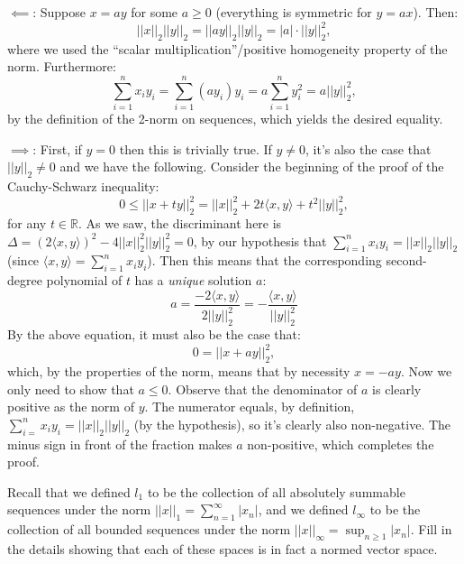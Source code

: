 \begin{solution}

    $\impliedby$: Suppose $x = ay$ for some $a \geq 0$ (everything is symmetric for $y = ax$).
    Then:
    $$\lvert \lvert x \rvert \rvert_2 \lvert \lvert y \rvert \rvert_2 = \lvert \lvert a y \rvert \rvert_2 \lvert \lvert y \rvert \rvert_2 = \lvert a \rvert \cdot \lvert \lvert y \rvert \rvert_2^2,$$
    where we used the ``scalar multiplication''/positive homogeneity property of the norm.
    Furthermore:
    $$\sum_{i = 1}^{n} x_i y_i = \sum_{i=1}^{n} (a y_i) y_i = a \sum_{i=1}^{n} y_i^2 = a \lvert \lvert y \rvert \rvert_2^2,$$ 
    by the definition of the 2-norm on sequences, which yields the desired equality.

    $\implies$: First, if $y = 0$ then this is trivially true. If $y \neq 0$, it's also the case that $\lvert \lvert y \rvert \rvert_2 \neq 0$ and we have the following.
    Consider the beginning of the proof of the Cauchy-Schwarz inequality:
    $$0 \leq \lvert \lvert x + ty \rvert \rvert_2^2 = \lvert \lvert x \rvert \rvert_2^2 + 2t \langle x, y \rangle + t^2 \lvert \lvert y \rvert \rvert_2^2,$$
    for any $t \in \mathbb{R}$. 
    As we saw, the discriminant here is $\Delta = (2\langle x, y \rangle)^2 - 4 \lvert \lvert x \rvert \rvert_2^2 \lvert \lvert y \rvert \rvert_2^2 = 0$, by our hypothesis that $\sum_{i=1}^{n} x_i y_i = \lvert \lvert x \rvert \rvert_2 \lvert \lvert y \rvert \rvert_2$ (since $\langle x, y \rangle = \sum_{i=1}^{n} x_i y_i$).
    Then this means that the corresponding second-degree polynomial of $t$ has a \textit{unique} solution $a$:
    $$a = \frac{-2 \langle x, y \rangle}{2\lvert \lvert y \rvert \rvert_2^2} = -\frac{ \langle x, y \rangle}{\lvert \lvert y \rvert \rvert_2^2}$$
    By the above equation, it must also be the case that:
    $$0 = \lvert \lvert x + ay \rvert \rvert_2^2,$$
    which, by the properties of the norm, means that by necessity $x = -ay$.
    Now we only need to show that $a \leq 0$.
    Observe that the denominator of $a$ is clearly positive as the norm of $y$.
    The numerator equals, by definition, $\sum_{i=}^{n} x_i y_i = \lvert \lvert x \rvert \rvert_2 \lvert \lvert y \rvert \rvert_2$ (by the hypothesis), so it's clearly also non-negative.
    The minus sign in front of the fraction makes $a$ non-positive, which completes the proof.

\end{solution}

\begin{exercise}{21}
    Recall that we defined $l_1$ to be the collection of all absolutely summable sequences under the norm $\lvert \lvert x \rvert \rvert_1 = \sum_{n=1}^{\infty} \lvert x_n \rvert$, and we defined $l_{\infty}$ to be the collection of all bounded sequences under the norm $\lvert \lvert x \rvert \rvert_{\infty} = \sup_{n \geq 1} \lvert x_n \rvert$.
    Fill in the details showing that each of these spaces is in fact a normed vector space.
\end{exercise}

